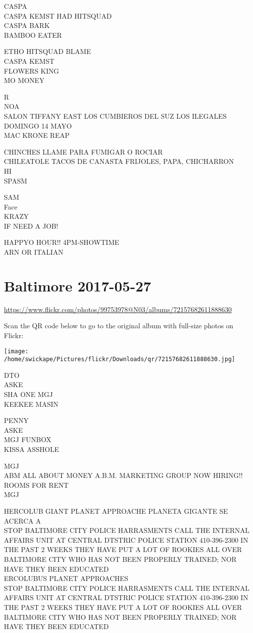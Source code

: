 \documentclass[10pt,letterpaper]{article}
\begin{document}
CASPA\\
CASPA KEMST HAD HITSQUAD\\
CASPA BARK\\
BAMBOO EATER

ETHO HITSQUAD BLAME\\
CASPA KEMST\\
FLOWERS KING\\
MO MONEY

R\\
NOA\\
SALON TIFFANY EAST LOS CUMBIEROS DEL SUZ LOS ILEGALES DOMINGO 14 MAYO\\
MAC KRONE REAP

CHINCHES LLAME PARA FUMIGAR O ROCIAR\\
CHILEATOLE TACOS DE CANASTA FRIJOLES, PAPA, CHICHARRON\\
HI\\
SPASM

SAM\\
Face\\
KRAZY\\
IF NEED A JOB!

HAPPYO HOUR!! 4PM{-}SHOWTIME\\
ARN OR ITALIAN


\section*{Baltimore 2017-05-27}

\url{https://www.flickr.com/photos/99753978@N03/albums/72157682611888630}

Scan the QR code below to go to the original album with full-size photos on Flickr:

\texttt{[image: /home/swickape/Pictures/flickr/Downloads/qr/72157682611888630.jpg]}


DTO\\
ASKE\\
SHA ONE MGJ\\
KEEKEE MASIN

PENNY\\
ASKE\\
MGJ FUNBOX\\
KISSA ASSHOLE

MGJ\\
ABM ALL ABOUT MONEY A.B.M. MARKETING GROUP NOW HIRING!!\\
ROOMS FOR RENT\\
MGJ

HERCOLUB GIANT PLANET APPROACHE PLANETA GIGANTE SE ACERCA A\\
STOP BALTIMORE CITY POLICE HARRASMENTS CALL THE INTERNAL AFFAIRS UNIT AT CENTRAL DTSTRIC POLICE STATION 410{-}396{-}2300 IN THE PAST 2 WEEKS THEY HAVE PUT A LOT OF ROOKIES ALL OVER BALTIMORE CITY WHO HAS NOT BEEN PROPERLY TRAINED; NOR HAVE THEY BEEN EDUCATED\\
ERCOLUBUS PLANET APPROACHES\\
STOP BALTIMORE CITY POLICE HARRASMENTS CALL THE INTERNAL AFFAIRS UNIT AT CENTRAL DTSTRIC POLICE STATION 410{-}396{-}2300 IN THE PAST 2 WEEKS THEY HAVE PUT A LOT OF ROOKIES ALL OVER BALTIMORE CITY WHO HAS NOT BEEN PROPERLY TRAINED; NOR HAVE THEY BEEN EDUCATED
\end{document}
